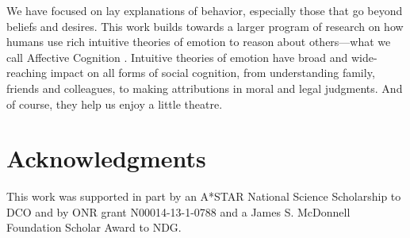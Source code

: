 \documentclass[10pt,letterpaper]{article}
\begin{document}

We have focused on lay explanations of behavior, especially those that go beyond beliefs and desires. This work builds towards a larger program of research on how humans use rich intuitive theories of emotion to reason about others---what we call Affective Cognition \cite{Ong2015AffCog}. Intuitive theories of emotion have broad and wide-reaching impact on all forms of social cognition, from understanding family, friends and colleagues, to making attributions in moral and legal judgments. And of course, they help us enjoy a little theatre. 







\section{Acknowledgments}

This work was supported in part by an A*STAR National Science Scholarship to DCO and by ONR grant N00014-13-1-0788 and a James S. McDonnell Foundation Scholar Award to NDG.




\setlength{\bibleftmargin}{.125in}
\setlength{\bibindent}{-\bibleftmargin}


\end{document}
